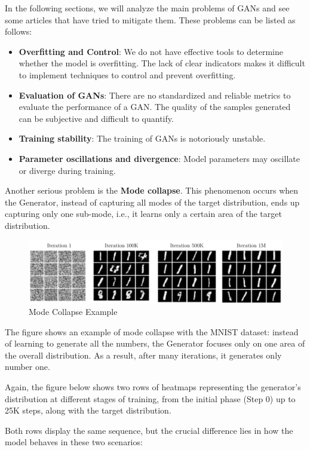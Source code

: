 In the following sections, we will analyze the main problems of GANs and see some articles that have tried to mitigate them. These problems can be listed as follows:
\begin{itemize}
    \item \textbf{Overfitting and Control}: We do not have effective tools to determine whether the model is overfitting. The lack of clear indicators makes it difficult to implement techniques to control and prevent overfitting.
    \item \textbf{Evaluation of GANs}: There are no standardized and reliable metrics to evaluate the performance of a GAN. The quality of the samples generated can be subjective and difficult to quantify.
    \item \textbf{Training stability}: The training of GANs is notoriously unstable. 
    \item \textbf{Parameter oscillations and divergence}: Model parameters may oscillate or diverge during training. 
\end{itemize}

Another serious problem is the \textbf{Mode collapse}. This phenomenon occurs when the Generator, instead of capturing all modes of the target distribution, ends up capturing only one sub-mode, i.e., it learns only a certain area of the target distribution.

\begin{figure}[!htbp]
    \centering
    \includegraphics[width=0.8\linewidth]{tikz/chapter9 - Mode Collapse MNIST.pdf}
    \caption{Mode Collapse Example}
\end{figure}

The figure shows an example of mode collapse with the MNIST dataset: instead of learning to generate all the numbers, the Generator focuses only on one area of the overall distribution. As a result, after many iterations, it generates only number one.

Again, the figure below shows two rows of heatmaps representing the generator's distribution at different stages of training, from the initial phase (Step 0) up to 25K steps, along with the target distribution.

Both rows display the same sequence, but the crucial difference lies in how the model behaves in these two scenarios:

